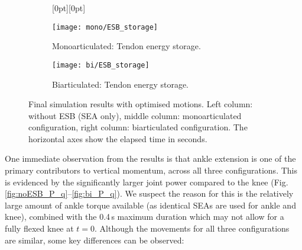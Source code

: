 \documentclass[letterpaper, 10 pt, conference]{ieeeconf}  %
\begin{document}
\begin{figure*}[ht]
	\vspace{1mm}
	
	\begin{subfigure}[t]{0.32\linewidth}
		\centering
		\raisebox{0pt}[0pt][0pt]{%
		}
	\end{subfigure}
	\begin{subfigure}[t]{0.32\linewidth}
		\texttt{[image: mono/ESB\_storage]}
		\caption{Monoarticulated: Tendon energy storage.}
		\label{fig:mono_ESB}
	\end{subfigure}
	\begin{subfigure}[t]{0.32\linewidth}
		\texttt{[image: bi/ESB\_storage]}
		\caption{Biarticulated: Tendon energy storage.}
		\label{fig:bi_ESB}
	\end{subfigure}
	
	\caption{Final simulation results with optimised motions. Left column: without ESB (SEA only), middle column: monoarticulated configuration, right column: biarticulated configuration. The horizontal axes show the elapsed time in seconds.}
	\label{fig:opt_results}
\end{figure*}




One immediate observation from the results is that ankle extension is one of the primary contributors to vertical momentum, across all three configurations. This is evidenced by the significantly larger joint power compared to the knee (Fig. \ref{fig:noESB_P_q}--\ref{fig:bi_P_q}). We suspect the reason for this is the relatively large amount of ankle torque available (as identical SEAs are used for ankle and knee), combined with the 0.4\,s maximum duration which may not allow for a fully flexed knee at $t=0$. Although the movements for all three configurations are similar, some key differences can be observed:
\end{document}
